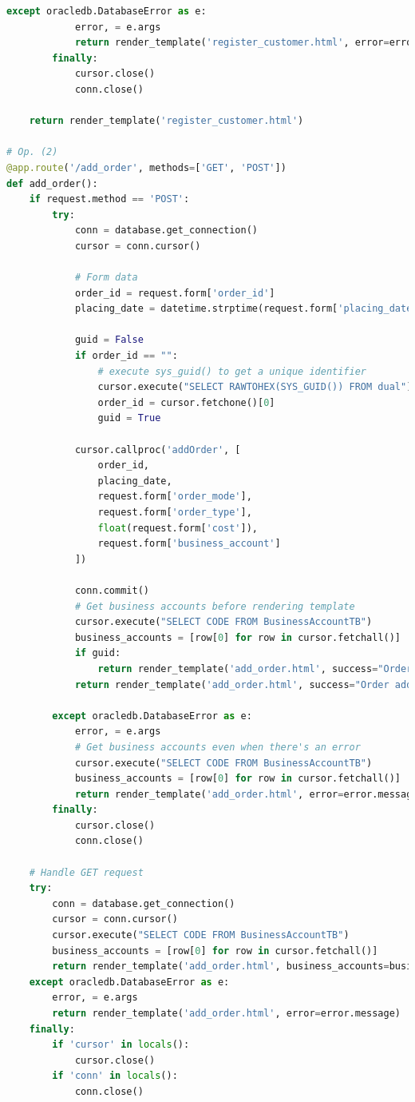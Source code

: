 \begin{lstlisting}[language=python]
        except oracledb.DatabaseError as e:
            error, = e.args
            return render_template('register_customer.html', error=error.message)
        finally:
            cursor.close()
            conn.close()
    
    return render_template('register_customer.html')

# Op. (2)
@app.route('/add_order', methods=['GET', 'POST'])
def add_order():
    if request.method == 'POST':
        try:
            conn = database.get_connection()
            cursor = conn.cursor()
            
            # Form data
            order_id = request.form['order_id']
            placing_date = datetime.strptime(request.form['placing_date'], '%Y-%m-%d').date()

            guid = False            
            if order_id == "":
                # execute sys_guid() to get a unique identifier 
                cursor.execute("SELECT RAWTOHEX(SYS_GUID()) FROM dual")
                order_id = cursor.fetchone()[0]
                guid = True
            
            cursor.callproc('addOrder', [
                order_id,
                placing_date,
                request.form['order_mode'],
                request.form['order_type'],
                float(request.form['cost']),
                request.form['business_account']
            ])
            
            conn.commit()
            # Get business accounts before rendering template
            cursor.execute("SELECT CODE FROM BusinessAccountTB")
            business_accounts = [row[0] for row in cursor.fetchall()]
            if guid:
                return render_template('add_order.html', success="Order added successfully! Order ID: " + order_id, business_accounts=business_accounts)
            return render_template('add_order.html', success="Order added successfully!", business_accounts=business_accounts)
            
        except oracledb.DatabaseError as e:
            error, = e.args
            # Get business accounts even when there's an error
            cursor.execute("SELECT CODE FROM BusinessAccountTB")
            business_accounts = [row[0] for row in cursor.fetchall()]
            return render_template('add_order.html', error=error.message, business_accounts=business_accounts)
        finally:
            cursor.close()
            conn.close()
    
    # Handle GET request
    try:
        conn = database.get_connection()
        cursor = conn.cursor()
        cursor.execute("SELECT CODE FROM BusinessAccountTB")
        business_accounts = [row[0] for row in cursor.fetchall()]
        return render_template('add_order.html', business_accounts=business_accounts)
    except oracledb.DatabaseError as e:
        error, = e.args
        return render_template('add_order.html', error=error.message)
    finally:
        if 'cursor' in locals():
            cursor.close()
        if 'conn' in locals():
            conn.close()
    


\end{lstlisting}
